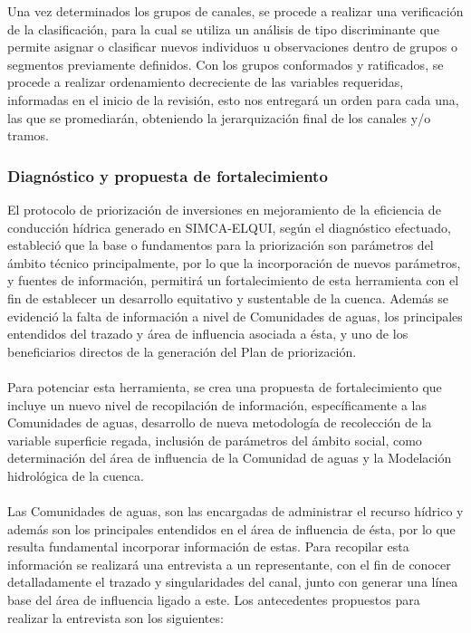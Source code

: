 \documentclass[]{article}
\begin{document}
Una vez determinados los grupos de canales, se procede a realizar una verificación de la clasificación, para la cual se utiliza un análisis de tipo discriminante que permite asignar o clasificar nuevos individuos u observaciones dentro de grupos o segmentos previamente definidos. Con los grupos conformados y ratificados, se procede a realizar ordenamiento decreciente de las variables requeridas, informadas en el inicio de la revisión, esto nos entregará un orden para cada una, las que se promediarán, obteniendo la jerarquización final de los canales y/o tramos.

\subsubsection{Diagnóstico y propuesta de fortalecimiento}

El protocolo de priorización de inversiones en mejoramiento de la eficiencia de conducción hídrica generado en SIMCA-ELQUI, según el diagnóstico efectuado, estableció que la base o fundamentos para la priorización son parámetros del ámbito técnico principalmente, por lo que la incorporación de nuevos parámetros, y fuentes de información, permitirá un fortalecimiento de esta herramienta con el fin de establecer un desarrollo equitativo y sustentable de la cuenca. Además se evidenció la falta de información a nivel de Comunidades de aguas, los principales entendidos del trazado y área de influencia asociada a ésta, y uno de los beneficiarios directos de la generación del Plan de priorización.\\
\\
Para potenciar esta herramienta, se crea una propuesta de fortalecimiento que incluye un nuevo nivel de recopilación de información, específicamente a las Comunidades de aguas, desarrollo de nueva metodología de recolección de la variable superficie regada, inclusión de parámetros del ámbito social, como determinación del área de influencia de la Comunidad de aguas y la Modelación hidrológica de la cuenca.\\
\\
Las Comunidades de aguas, son las encargadas de administrar el recurso hídrico y además son los principales entendidos en el área de influencia de ésta, por lo que resulta fundamental incorporar información de estas. Para recopilar esta información se realizará una entrevista a un representante, con el fin de conocer detalladamente el trazado y singularidades del canal, junto con generar una línea base del área de influencia ligado a este. Los antecedentes propuestos para realizar la entrevista son los siguientes:
\end{document}
